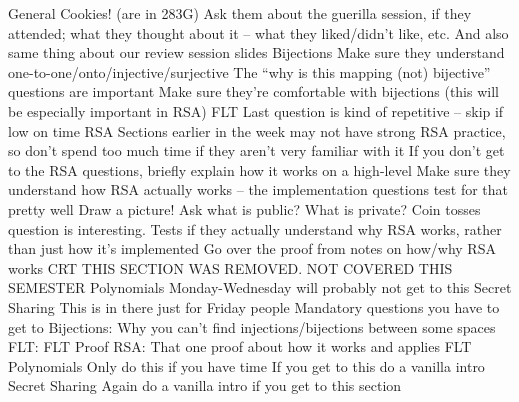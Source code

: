 General
Cookies! (are in 283G)
Ask them about the guerilla session, if they attended; what they thought about it – what they liked/didn’t like, etc.
And also same thing about our review session slides
Bijections
Make sure they understand one-to-one/onto/injective/surjective
The “why is this mapping (not) bijective” questions are important
Make sure they’re comfortable with bijections (this will be especially important in RSA)
FLT
Last question is kind of repetitive – skip if low on time
RSA
Sections earlier in the week may not have strong RSA practice, so don’t spend too much time if they aren’t very familiar with it
If you don’t get to the RSA questions, briefly explain how it works on a high-level
Make sure they understand how RSA actually works – the implementation questions test for that pretty well
Draw a picture! Ask what is public? What is private?
Coin tosses question is interesting. Tests if they actually understand why RSA works, rather than just how it’s implemented
Go over the proof from notes on how/why RSA works
CRT
THIS SECTION WAS REMOVED. NOT COVERED THIS SEMESTER
Polynomials
Monday-Wednesday will probably not get to this
Secret Sharing
This is in there just for Friday people
Mandatory questions you have to get to
Bijections: 
Why you can’t find injections/bijections between some spaces
FLT:
FLT Proof
RSA:
That one proof about how it works and applies FLT
Polynomials
Only do this if you have time
If you get to this do a vanilla intro
Secret Sharing
Again do a vanilla intro if you get to this section
